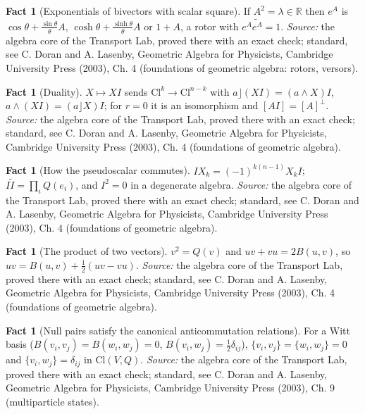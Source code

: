 \documentclass[11pt]{article}
\theoremstyle{definition}
\newtheorem{fact}[theorem]{Fact}
\theoremstyle{plain}
\providecommand{\Cl}{}\renewcommand{\Cl}{\mathrm{Cl}}
\providecommand{\R}{}\renewcommand{\R}{\mathbb{R}}
\begin{document}
\begin{fact}[Exponentials of bivectors with scalar square]\label{c:std-algebra.bivector-exponential}
If $A^{2} = \lambda \in \R$ then $e^{A}$ is $\cos\theta + \frac{\sin\theta}{\theta}A$, $\cosh\theta + \frac{\sinh\theta}{\theta}A$ or $1 + A$, a rotor with $e^{A}\widetilde{e^{A}} = 1$.
\emph{Source:} the algebra core of the Transport Lab, proved there with an exact check; standard, see C. Doran and A. Lasenby, Geometric Algebra for Physicists, Cambridge University Press (2003), Ch. 4 (foundations of geometric algebra: rotors, versors).
\end{fact}

\begin{fact}[Duality]\label{c:std-algebra.duality}
$X \mapsto XI$ sends $\Cl^{k} \to \Cl^{n-k}$ with $a \rfloor (XI) = (a \wedge X)I$, $a \wedge (XI) = (a \rfloor X)I$; for $r = 0$ it is an isomorphism and $[AI] = [A]^{\perp}$.
\emph{Source:} the algebra core of the Transport Lab, proved there with an exact check; standard, see C. Doran and A. Lasenby, Geometric Algebra for Physicists, Cambridge University Press (2003), Ch. 4 (foundations of geometric algebra).
\end{fact}

\begin{fact}[How the pseudoscalar commutes]\label{c:std-algebra.pseudoscalar-commutation}
$I X_k = (-1)^{k(n-1)} X_k I$; $I\tilde{I} = \prod_i Q(e_i)$, and $I^{2} = 0$ in a degenerate algebra.
\emph{Source:} the algebra core of the Transport Lab, proved there with an exact check; standard, see C. Doran and A. Lasenby, Geometric Algebra for Physicists, Cambridge University Press (2003), Ch. 4 (foundations of geometric algebra).
\end{fact}

\begin{fact}[The product of two vectors]\label{c:std-algebra.vector-squares}
$v^{2} = Q(v)$ and $uv + vu = 2B(u, v)$, so $uv = B(u, v) + \tfrac12(uv - vu)$.
\emph{Source:} the algebra core of the Transport Lab, proved there with an exact check; standard, see C. Doran and A. Lasenby, Geometric Algebra for Physicists, Cambridge University Press (2003), Ch. 4 (foundations of geometric algebra).
\end{fact}

\begin{fact}[Null pairs satisfy the canonical anticommutation relations]\label{c:std-algebra.witt-basis-car}
For a Witt basis ($B(v_i,v_j) = B(w_i,w_j) = 0$, $B(v_i,w_j) = \tfrac12\delta_{ij}$), $\{v_i,v_j\} = \{w_i,w_j\} = 0$ and $\{v_i,w_j\} = \delta_{ij}$ in $\Cl(V,Q)$.
\emph{Source:} the algebra core of the Transport Lab, proved there with an exact check; standard, see C. Doran and A. Lasenby, Geometric Algebra for Physicists, Cambridge University Press (2003), Ch. 9 (multiparticle states).
\end{fact}
\end{document}
